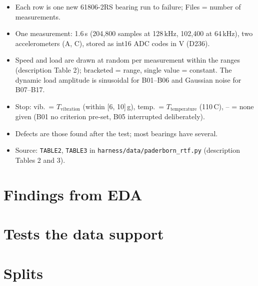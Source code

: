 \documentclass[11pt,a4paper]{article}
\begin{document}
\begin{itemize}
  \item Each row is one new 61806-2RS bearing run to failure; Files = number of measurements.
  \item One measurement: 1.6\,s (204,800 samples at 128\,kHz, 102,400 at 64\,kHz), two
        accelerometers (A, C), stored as int16 ADC codes in V (D236).
  \item Speed and load are drawn at random per measurement within the ranges (description
        Table 2); bracketed = range, single value = constant. The dynamic load amplitude is
        sinusoidal for B01--B06 and Gaussian noise for B07--B17.
  \item Stop: vib.\ = $T_\text{vibration}$ (within [6, 10]\,g), temp.\ = $T_\text{temperature}$
        (110\,\textdegree C), -- = none given (B01 no criterion pre-set, B05 interrupted
        deliberately).
  \item Defects are those found after the test; most bearings have several.
  \item Source: \texttt{TABLE2}, \texttt{TABLE3} in \texttt{harness/data/paderborn\_rtf.py}
        (description Tables 2 and 3).
\end{itemize}

\section{Findings from EDA}

\section{Tests the data support}

\section{Splits}
\end{document}
